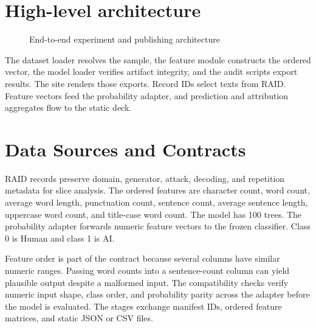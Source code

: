 \documentclass[12pt,oneside]{report}
\begin{document}
\section{High-level architecture}
\begin{figure}[htbp]\centering
{}
\caption{End-to-end experiment and publishing architecture}
\end{figure}
The dataset loader resolves the sample, the feature module constructs the ordered vector, the model loader verifies artifact integrity, and the audit scripts export results. The site renders those exports.
Record IDs select texts from RAID. Feature vectors feed the probability adapter, and prediction and attribution aggregates flow to the static deck.
\section{Data Sources and Contracts}
RAID records preserve domain, generator, attack, decoding, and repetition metadata for slice analysis.
The ordered features are character count, word count, average word length, punctuation count, sentence count, average sentence length, uppercase word count, and title-case word count. The model has 100 trees. The probability adapter forwards numeric feature vectors to the frozen classifier. Class 0 is Human and class 1 is AI.

Feature order is part of the contract because several columns have similar numeric ranges. Passing word counts into a sentence-count column can yield plausible output despite a malformed input. The compatibility checks verify numeric input shape, class order, and probability parity across the adapter before the model is evaluated.
The stages exchange manifest IDs, ordered feature matrices, and static JSON or CSV files.
\end{document}
